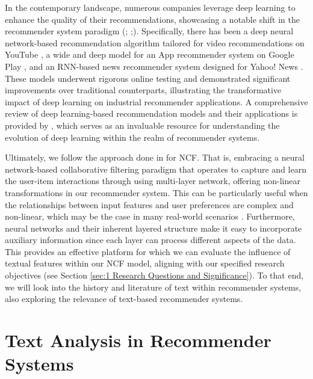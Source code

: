 In the contemporary landscape, numerous companies leverage deep learning to enhance the quality of their recommendations, showcasing a notable shift in the recommender system paradigm (\cite{cheng2016wide}; \cite{covington2016deep};\cite{okura2017embedding}). Specifically, there has been a deep neural network-based recommendation algorithm tailored for video recommendations on YouTube \cite{covington2016deep}, a wide and deep model for an App recommender system on Google Play \cite{cheng2016wide}, and an RNN-based news recommender system designed for Yahoo! News \cite{okura2017embedding}. These models underwent rigorous online testing and demonstrated significant improvements over traditional counterparts, illustrating the transformative impact of deep learning on industrial recommender applications. A comprehensive review of deep learning-based recommendation models and their applications is provided by \cite{zhang2019deep}, which serves as an invaluable resource for understanding the evolution of deep learning within the realm of recommender systems.

Ultimately, we follow the approach done in \cite{he2017neural} for NCF. That is, embracing a neural network-based collaborative filtering paradigm that operates to capture and learn the user-item interactions through using multi-layer network, offering non-linear transformations in our recommender system. This can be particularly useful when the relationships between input features and user preferences are complex and non-linear, which may be the case in many real-world scenarios \cite{he2017neural}. Furthermore, neural networks and their inherent layered structure make it easy to incorporate auxiliary information since each layer can process different aspects of the data. This provides an effective platform for which we can evaluate the influence of textual features within our NCF model, aligning with our specified research objectives (see Section \ref{sec:1 Research Questions and Significance}). To that end, we will look into the history and literature of text within recommender systems, also exploring the relevance of text-based recommender systems. 

\section{Text Analysis in Recommender Systems}
\label{sec:1 Text Analysis in Recommender Systems}

